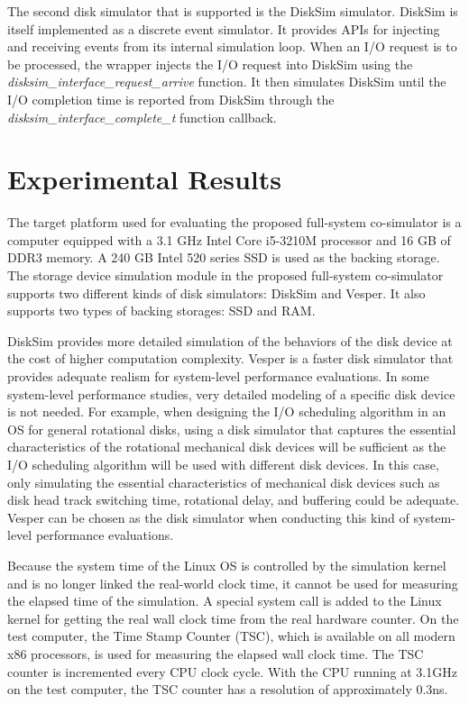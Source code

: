 The second disk simulator that is supported is the DiskSim simulator. DiskSim is itself implemented as a discrete event simulator. It provides APIs for injecting and receiving events from its internal simulation loop. When an I/O request is to be processed, the wrapper injects the I/O request into DiskSim using the \textit{disksim_interface_request_arrive} function. It then simulates DiskSim until the I/O completion time is reported from DiskSim through the \textit{disksim_interface_complete_t} function callback.

\section{Experimental Results}
\label{sec:ch5-experimental-results}
The target platform used for evaluating the proposed full-system co-simulator is a computer equipped with a 3.1 GHz Intel Core i5-3210M processor and 16 GB of DDR3 memory. A 240 GB Intel 520 series SSD is used as the backing storage. The storage device simulation module in the proposed full-system co-simulator supports two different kinds of disk simulators: DiskSim and Vesper. It also supports two types of backing storages: SSD and RAM.

DiskSim provides more detailed simulation of the behaviors of the disk device at the cost of higher computation complexity. Vesper is a faster disk simulator that provides adequate realism for system-level performance evaluations. In some system-level performance studies, very detailed modeling of a specific disk device is not needed. For example, when designing the I/O scheduling algorithm in an OS for general rotational disks, using a disk simulator that captures the essential characteristics of the rotational mechanical disk devices will be sufficient as the I/O scheduling algorithm will be used with different disk devices. In this case, only simulating the essential characteristics of mechanical disk devices such as disk head track switching time, rotational delay, and buffering could be adequate. Vesper can be chosen as the disk simulator when conducting this kind of system-level performance evaluations.

Because the system time of the Linux OS is controlled by the simulation kernel and is no longer linked the real-world clock time, it cannot be used for measuring the elapsed time of the simulation. A special system call is added to the Linux kernel for getting the real wall clock time from the real hardware counter. On the test computer, the Time Stamp Counter (TSC), which is available on all modern x86 processors, is used for measuring the elapsed wall clock time. The TSC counter is incremented every CPU clock cycle. With the CPU running at 3.1GHz on the test computer, the TSC counter has a resolution of approximately 0.3\si{\nano\second}.


